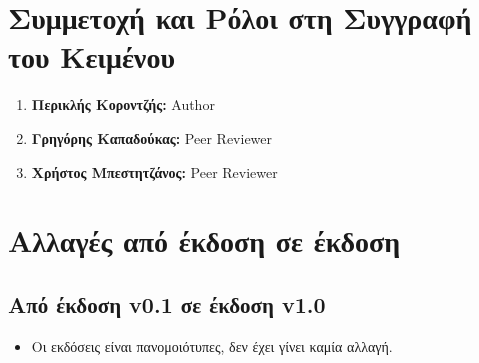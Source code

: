 \documentclass[12pt,a4paper]{article}
\begin{document}
\section{Συμμετοχή και Ρόλοι στη Συγγραφή του Κειμένου}
\begin{enumerate}
	\item \textbf{Περικλής Κοροντζής:} Author
	\item \textbf{Γρηγόρης Καπαδούκας:} Peer Reviewer
	\item \textbf{Χρήστος Μπεστητζάνος:} Peer Reviewer
\end{enumerate}

\section{Αλλαγές από έκδοση σε έκδοση}

\subsection{Από έκδοση v0.1 σε έκδοση v1.0}
\begin{itemize}
    \item Οι εκδόσεις είναι πανομοιότυπες, δεν έχει γίνει καμία αλλαγή.
\end{itemize}
\end{document}
